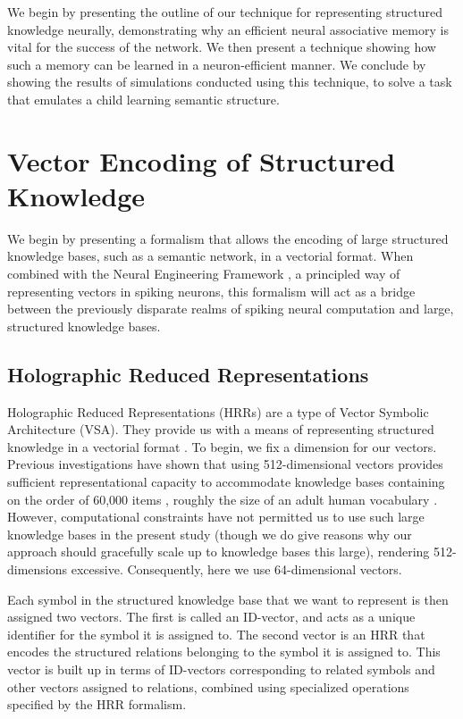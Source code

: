 \documentclass[10pt,letterpaper]{article}
\begin{document}
We begin by presenting the outline of our technique for representing structured knowledge neurally, demonstrating why  an efficient neural associative memory is vital for the success of the network. We then present a technique showing how such a memory can be learned in a neuron-efficient manner. We conclude by showing the results of simulations conducted using this technique, to solve a task that emulates a child learning semantic structure.

\section{Vector Encoding of Structured Knowledge}
We begin by presenting a formalism that allows the encoding of large structured knowledge bases, such as a semantic network, in a vectorial format. When combined with the Neural Engineering Framework \citep{Eliasmith2003m}, a principled way of representing vectors in spiking neurons, this formalism will act as a bridge between the previously disparate realms of spiking neural computation and large, structured knowledge bases.

\subsection{Holographic Reduced Representations}
Holographic Reduced Representations (HRRs) are a type of Vector Symbolic Architecture (VSA). They provide us with a means of representing structured knowledge in a vectorial format \citep{Plate2003d}.  To begin, we fix a dimension for our vectors. 
Previous investigations have shown that using 512-dimensional vectors provides sufficient representational capacity to accommodate knowledge bases containing on the order of 60,000 items \citep{Eliasmith2012}, roughly the size of an adult human vocabulary \citep{Ogrady}. However, computational constraints have not permitted us to use such large knowledge bases in the present study (though we do give reasons why our approach should gracefully scale up to knowledge bases this large), rendering 512-dimensions excessive. Consequently, here we use 64-dimensional vectors. 

Each symbol in the structured knowledge base that we want to represent is then assigned two vectors. The first is called an ID-vector, and acts as a unique identifier for the symbol it is assigned to. The second vector is an HRR that encodes the structured relations belonging to the symbol it is assigned to. This vector is built up in terms of ID-vectors corresponding to related symbols and other vectors assigned to relations, combined using specialized operations specified by the HRR formalism.
\end{document}
